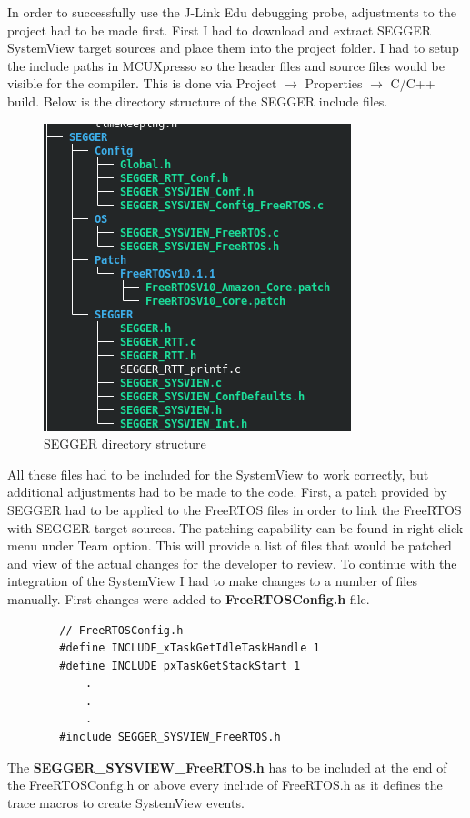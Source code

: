 \documentclass[12pt,a4paper]{article}
\begin{document}
		In order to successfully use the J-Link Edu debugging probe, adjustments to the project had to be made first.
		First I had to download and extract SEGGER SystemView target sources and place them into the project folder. I had to setup the include paths in MCUXpresso so the header files and source files would be visible for the compiler. This is done via Project $\rightarrow$ Properties $\rightarrow$ C/C++ build. Below is the directory structure of the SEGGER include files.
		\begin{figure}[h]
            \centering
            \includegraphics[scale=1]{SEGGER_directory_structure}
            \caption{SEGGER directory structure}
		\end{figure}
		All these files had to be included for the SystemView to work correctly, but additional adjustments had to be made to the code. First, a patch provided by SEGGER had to be applied to the FreeRTOS files in order to link the FreeRTOS with SEGGER target sources. The patching capability can be found in right-click menu under Team option. This will provide a list of files that would be patched and view of the actual changes for the developer to review.
		To continue with the integration of the SystemView I had to make changes to a number of files manually. First changes were added to {\bfseries FreeRTOSConfig.h} file.
		\begin{lstlisting}
        // FreeRTOSConfig.h
        #define INCLUDE_xTaskGetIdleTaskHandle 1
        #define INCLUDE_pxTaskGetStackStart 1
            .
            .
            .
        #include SEGGER_SYSVIEW_FreeRTOS.h
		\end{lstlisting}
		The {\bfseries SEGGER\_SYSVIEW\_FreeRTOS.h} has to be included at the end of the FreeRTOSConfig.h or above every include of FreeRTOS.h as it defines the trace macros to create SystemView events.\\
		
\end{document}
